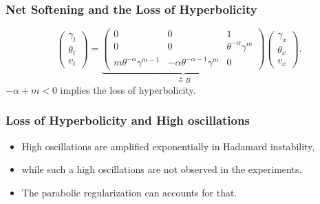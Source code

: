 \documentclass{beamer}
\def\blue{\color{blue}}
\begin{document}
\begin{frame}
 \frametitle{Net Softening and the Loss of Hyperbolicity}
\begin{equation} \label{eq:transport}
 \begin{pmatrix} \gamma_t \\ \theta_t \\ v_t \end{pmatrix} = \underbrace{
 \begin{pmatrix}
  0 & 0 & 1\\
  0 & 0 & \theta^{-\alpha}\gamma^m \\
  m\theta^{-\alpha}\gamma^{m-1} & -\alpha\theta^{-\alpha-1}\gamma^m & 0\end{pmatrix}}_\text{$\triangleq B$}
  \begin{pmatrix} \gamma_x \\ \theta_x \\ v_x \end{pmatrix}. 
\end{equation}
\vfill
$-\alpha+m<0$ implies the loss of hyperbolicity.
\end{frame}

\begin{frame}
 \frametitle{Loss of Hyperbolicity and High oscillations}
 \begin{itemize}
  \item High oscillations are amplified exponentially in Hadamard instability,
  \item while such a high oscillations are not observed in the experiments. %
  \item The parabolic regularization can accounts for that.
 \end{itemize}
 \vfill
\end{frame}
\end{document}

